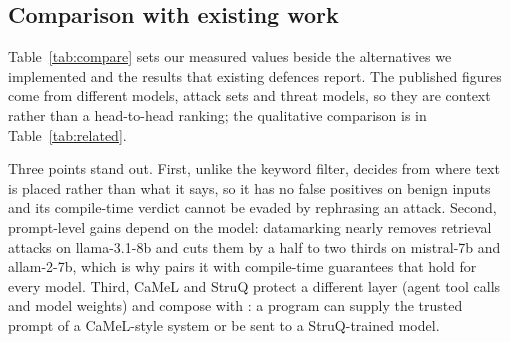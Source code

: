 \documentclass[conference]{IEEEtran}
\begin{document}
\subsection{Comparison with existing work}\label{sec:compare}
Table~\ref{tab:compare} sets our measured values beside the alternatives we implemented and the results that existing defences report. The published figures come from different models, attack sets and threat models, so they are context rather than a head-to-head ranking; the qualitative comparison is in Table~\ref{tab:related}.

\begin{table}[t]
\caption{Measured and reported results of prompt-injection defences}
\label{tab:compare}
\centering
{}
\end{table}

Three points stand out. First, unlike the keyword filter, \TL{} decides from where text is placed rather than what it says, so it has no false positives on benign inputs and its compile-time verdict cannot be evaded by rephrasing an attack. Second, prompt-level gains depend on the model: datamarking nearly removes retrieval attacks on llama-3.1-8b and cuts them by a half to two thirds on mistral-7b and allam-2-7b, which is why \TL{} pairs it with compile-time guarantees that hold for every model. Third, CaMeL and StruQ protect a different layer (agent tool calls and model weights) and compose with \TL{}: a \TL{} program can supply the trusted prompt of a CaMeL-style system or be sent to a StruQ-trained model.
\end{document}
